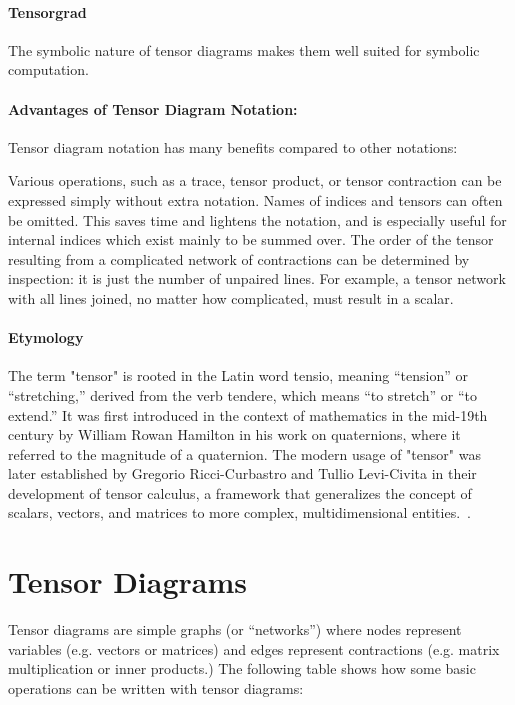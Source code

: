 \paragraph{Tensorgrad}
The symbolic nature of tensor diagrams makes them well suited for symbolic computation.

\paragraph{Advantages of Tensor Diagram Notation:}
Tensor diagram notation has many benefits compared to other notations:

Various operations, such as a trace, tensor product, or tensor contraction can be expressed simply without extra notation.
Names of indices and tensors can often be omitted. This saves time and lightens the notation, and is especially useful for internal indices which exist mainly to be summed over.
The order of the tensor resulting from a complicated network of contractions can be determined by inspection: it is just the number of unpaired lines. For example, a tensor network with all lines joined, no matter how complicated, must result in a scalar.


\paragraph{Etymology}
The term "tensor" is rooted in the Latin word tensio, meaning ``tension'' or ``stretching,'' derived from the verb tendere, which means ``to stretch'' or ``to extend.''
It was first introduced in the context of mathematics in the mid-19th century by William Rowan Hamilton in his work on quaternions, where it referred to the magnitude of a quaternion.
The modern usage of "tensor" was later established by Gregorio Ricci-Curbastro and Tullio Levi-Civita in their development of tensor calculus, a framework that generalizes the concept of scalars, vectors, and matrices to more complex, multidimensional entities.~\cite{tensor_etymology_russo, hamilton_tensor}.


\tableofcontents
\clearpage


\section{Tensor Diagrams}
Tensor diagrams are simple graphs (or ``networks'') where
nodes represent variables (e.g. vectors or matrices) and edges represent
contractions (e.g. matrix multiplication or inner products.)
The following table shows how some basic operations can be written with tensor diagrams:

